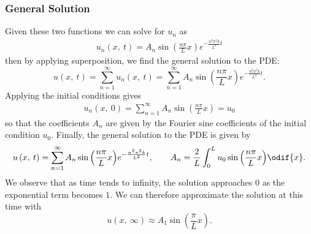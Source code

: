 \documentclass{article}
\begin{document}
\subsubsection{General Solution}
Given these two functions we can solve for \(u_n\) as
\begin{align*}
    u_n\left( x,\: t \right) = A_n \sin{\left( \frac{n \pi}{L} x \right)} e^{-\frac{n^2 \pi^2 k}{L^2} t}
\end{align*}
then by applying superposition, we find the general solution to the PDE\@:
\begin{equation*}
    u\left( x,\: t \right) = \sum_{n = 1}^\infty u_n\left( x,\: t \right) = \sum_{n = 1}^\infty A_n \sin{\left( \frac{n \pi}{L} x \right)} e^{-\frac{n^2 \pi^2 k}{L^2} t}.
\end{equation*}
Applying the initial conditions gives
\begin{align*}
    u_n\left( x,\: 0 \right) = \sum_{n = 1}^\infty A_n \sin{\left( \frac{n \pi}{L} x \right)} = u_0
\end{align*}
so that the coefficients \(A_n\) are given by the Fourier sine coefficients of the initial condition \(u_0\).
Finally, the general solution to the PDE is given by
\begin{equation*}
    u\left( x,\: t \right) = \sum_{n = 1}^\infty A_n \sin{\left( \frac{n \pi}{L} x \right)} e^{-\frac{n^2 \pi^2 k}{L^2} t}, \quad \quad A_n = \frac{2}{L} \int_0^L u_0 \sin{\left( \frac{n \pi}{L} x \right)} \odif{x}.
\end{equation*}
We observe that as time tends to infinity, the solution approaches \(0\) as the exponential term
becomes \(1\). We can therefore approximate the solution at this time with 
\begin{equation*}
    u\left( x,\: \infty \right) \approx A_1 \sin{\left( \frac{\pi}{L} x \right)}.
\end{equation*}
\end{document}
